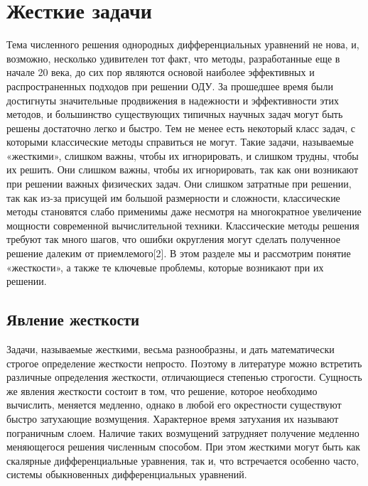 \documentclass[a4paper,14pt]{extreport}
\begin{document}
  \chapter{Жесткие задачи}
  \label{c:stiff_problems}
  Тема численного решения однородных дифференциальных уравнений не нова, и, возможно, несколько удивителен тот факт, что методы, разработанные еще в начале 20 века, до сих пор являются основой наиболее эффективных и распространенных подходов при решении ОДУ. За прошедшее время были достигнуты значительные продвижения в надежности и эффективности этих методов, и большинство существующих типичных научных задач могут быть решены достаточно легко и быстро. Тем не менее есть некоторый класс задач, с которыми классические методы справиться не могут. Такие задачи, называемые «жесткими», слишком важны, чтобы их игнорировать, и слишком трудны, чтобы их решить. Они слишком важны, чтобы их игнорировать, так как они возникают при решении важных физических задач. Они слишком затратные при решении, так как из-за присущей им большой размерности и сложности, классические методы становятся слабо применимы даже несмотря на многократное увеличение мощности современной вычислительной техники. Классические методы решения требуют так много шагов, что ошибки округления могут сделать полученное решение далеким от приемлемого[2]. В этом разделе мы и рассмотрим понятие «жесткости», а также те ключевые проблемы, которые возникают при их решении.

  \section{Явление жесткости}
  \label{s:stiffness}
  Задачи, называемые жесткими, весьма разнообразны, и дать математически строгое определение жесткости непросто. Поэтому в литературе можно встретить различные определения жесткости, отличающиеся степенью строгости. Сущность же явления жесткости состоит в том, что решение, которое необходимо вычислить, меняется медленно, однако в любой его окрестности существуют быстро затухающие возмущения. Характерное время затухания их называют пограничным слоем. Наличие таких возмущений затрудняет получение медленно меняющегося решения численным способом. При этом жесткими могут быть как скалярные дифференциальные уравнения, так и, что встречается особенно часто, системы обыкновенных дифференциальных уравнений.
  
\end{document}
